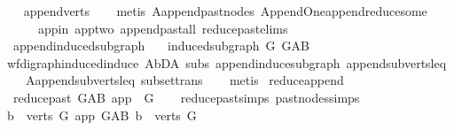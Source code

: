 \begin{isabellebody}
\ \ \isamarkupfalse%
\ append{\isacharunderscore}{\kern0pt}verts\isanewline
\ \ \isamarkupfalse%
\ {\isacharparenleft}{\kern0pt}metis\ A{}{\isachardot}{\kern0pt}append{\isacharunderscore}{\kern0pt}past{\isacharunderscore}{\kern0pt}nodes\ Append{\isacharunderscore}{\kern0pt}One{\isachardot}{\kern0pt}append{\isacharunderscore}{\kern0pt}reduce{\isacharunderscore}{\kern0pt}some\ \isanewline
\ \ \ \ \ \ app{\isacharunderscore}{\kern0pt}in\ app{\isacharunderscore}{\kern0pt}two\ append{\isacharunderscore}{\kern0pt}past{\isacharunderscore}{\kern0pt}all\ reduce{\isacharunderscore}{\kern0pt}past{\isachardot}{\kern0pt}elims{\isacharparenright}{\kern0pt}%
\endisatagproof
{\isafoldproof}%
%
\isadelimproof
\ \isanewline
%
\endisadelimproof
\isanewline
{}\isamarkupfalse%
\ \ append{\isacharunderscore}{\kern0pt}induced{\isacharunderscore}{\kern0pt}subgraph{}{\isacharcolon}{\kern0pt}\ \isanewline
\ \ {\isachardoublequoteopen}induced{\isacharunderscore}{\kern0pt}subgraph\ G\ G{\isacharunderscore}{\kern0pt}AB{\isachardoublequoteclose}\isanewline
%
\isadelimproof
\ \ %
\endisadelimproof
%
\isatagproof
{}\isamarkupfalse%
\ wf{\isacharunderscore}{\kern0pt}digraph{\isachardot}{\kern0pt}induced{\isacharunderscore}{\kern0pt}induce\ A{}{\isachardot}{\kern0pt}bD{\isacharunderscore}{\kern0pt}A\ subs\ append{\isacharunderscore}{\kern0pt}induce{\isacharunderscore}{\kern0pt}subgraph{}\ append{\isacharunderscore}{\kern0pt}subverts{\isacharunderscore}{\kern0pt}leq\isanewline
\ \ \ \ A{}{\isachardot}{\kern0pt}append{\isacharunderscore}{\kern0pt}subverts{\isacharunderscore}{\kern0pt}leq\ subset{\isacharunderscore}{\kern0pt}trans\isanewline
\ \ \isamarkupfalse%
\ metis%
\endisatagproof
{\isafoldproof}%
%
\isadelimproof
\isanewline
%
\endisadelimproof
\isanewline
\isanewline
\isanewline
{}\isamarkupfalse%
\ reduce{\isacharunderscore}{\kern0pt}append{}{\isacharcolon}{\kern0pt}\isanewline
\ \ {\isachardoublequoteopen}reduce{\isacharunderscore}{\kern0pt}past\ G{\isacharunderscore}{\kern0pt}AB\ app\ {\isacharequal}{\kern0pt}\ G{\isachardoublequoteclose}\isanewline
%
\isadelimproof
\ \ %
\endisadelimproof
%
\isatagproof
{}\isamarkupfalse%
\ reduce{\isacharunderscore}{\kern0pt}past{\isachardot}{\kern0pt}simps\ past{\isacharunderscore}{\kern0pt}nodes{\isachardot}{\kern0pt}simps\ \isanewline
{}\isamarkupfalse%
\ {\isacharminus}{\kern0pt}\isanewline
\ \ \isamarkupfalse%
\ {\isachardoublequoteopen}{\isacharbraceleft}{\kern0pt}b\ {\isasymin}\ verts\ G{\isachardot}{\kern0pt}\ app\ {\isasymrightarrow}\isactrlsup {\isacharplus}{\kern0pt}\isactrlbsub G{\isacharunderscore}{\kern0pt}AB\isactrlesub \ b{\isacharbraceright}{\kern0pt}\ {\isacharequal}{\kern0pt}\ verts\ G{\isachardoublequoteclose}\isanewline

\end{isabellebody}
